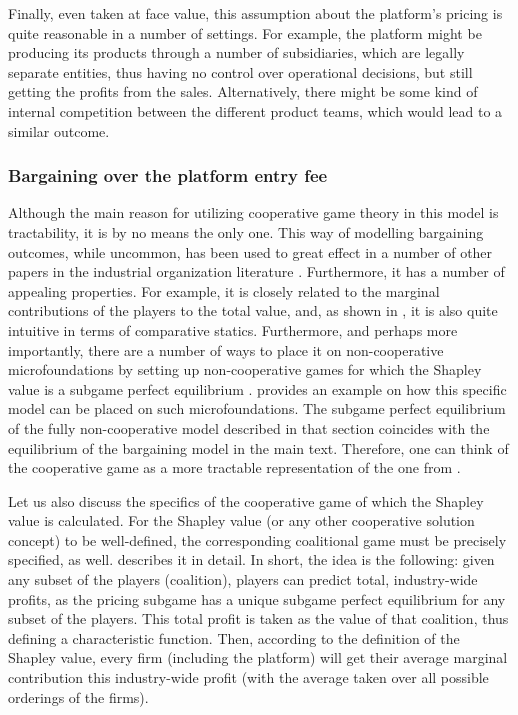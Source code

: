 \documentclass[a4paper]{article}
\begin{document}
Finally, even taken at face value, this assumption about the platform's pricing is quite reasonable in a number of settings.
For example, the platform might be producing its products through a number of subsidiaries, which are legally separate entities, thus having no control over operational decisions, but still getting the profits from the sales.
Alternatively, there might be some kind of internal competition between the different product teams, which would lead to a similar outcome.

\subsubsection{Bargaining over the platform entry fee}

Although the main reason for utilizing cooperative game theory in this model is tractability, it is by no means the only one.
This way of modelling bargaining outcomes, while uncommon, has been used to great effect in a number of other papers in the industrial organization literature \parencite[e.g.][]{montez2007downstream,hart1990property,levy1997individual,inderst2003bargaining,brugemann2019intra}.
Furthermore, it has a number of appealing properties.
For example, it is closely related to the marginal contributions of the players to the total value, and, as shown in , it is also quite intuitive in terms of comparative statics.
Furthermore, and perhaps more importantly, there are a number of ways to place it on non-cooperative microfoundations by setting up non-cooperative games for which the Shapley value is a subgame perfect equilibrium \parencite[e.g.][]{gul1989bargaining,hart1996bargaining,stole1996organizational}.
 provides an example on how this specific model can be placed on such microfoundations.
The subgame perfect equilibrium of the fully non-cooperative model described in that section coincides with the equilibrium of the bargaining model in the main text.
Therefore, one can think of the cooperative game as a more tractable representation of the one from .

Let us also discuss the specifics of the cooperative game of which the Shapley value is calculated.
For the Shapley value (or any other cooperative solution concept) to be well-defined, the corresponding coalitional game must be precisely specified, as well.
 describes it in detail. 
In short, the idea is the following: given any subset of the players (coalition), players can predict total, industry-wide profits, as the pricing subgame has a unique subgame perfect equilibrium for any subset of the players.
This total profit is taken as the value of that coalition, thus defining a characteristic function.
Then, according to the definition of the Shapley value, every firm (including the platform) will get their average marginal contribution this industry-wide profit (with the average taken over all possible orderings of the firms).
\end{document}
